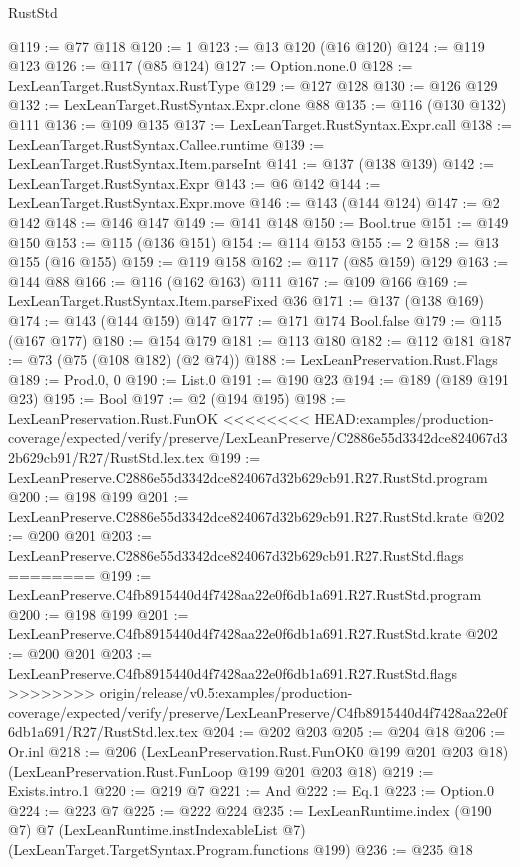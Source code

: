 \begin{lexlean}{RustStd}
\begin{coremodule}
{\begin{coremodule}
{{{{{@119 := @77 @118
@120 := 1
@123 := @13 @120 (@16 @120)
@124 := @119 @123
@126 := @117 (@85 @124)
@127 := Option.none.{0}
@128 := LexLeanTarget.RustSyntax.RustType
@129 := @127 @128
@130 := @126 @129
@132 := LexLeanTarget.RustSyntax.Expr.clone @88
@135 := @116 (@130 @132) @111
@136 := @109 @135
@137 := LexLeanTarget.RustSyntax.Expr.call
@138 := LexLeanTarget.RustSyntax.Callee.runtime
@139 := LexLeanTarget.RustSyntax.Item.parseInt
@141 := @137 (@138 @139)
@142 := LexLeanTarget.RustSyntax.Expr
@143 := @6 @142
@144 := LexLeanTarget.RustSyntax.Expr.move
@146 := @143 (@144 @124)
@147 := @2 @142
@148 := @146 @147
@149 := @141 @148
@150 := Bool.true
@151 := @149 @150
@153 := @115 (@136 @151)
@154 := @114 @153
@155 := 2
@158 := @13 @155 (@16 @155)
@159 := @119 @158
@162 := @117 (@85 @159) @129
@163 := @144 @88
@166 := @116 (@162 @163) @111
@167 := @109 @166
@169 := LexLeanTarget.RustSyntax.Item.parseFixed @36
@171 := @137 (@138 @169)
@174 := @143 (@144 @159) @147
@177 := @171 @174 Bool.false
@179 := @115 (@167 @177)
@180 := @154 @179
@181 := @113 @180
@182 := @112 @181
@187 := @73 (@75 (@108 @182) (@2 @74))
@188 := LexLeanPreservation.Rust.Flags
@189 := Prod.{0, 0}
@190 := List.{0}
@191 := @190 @23
@194 := @189 (@189 @191 @23)
@195 := Bool
@197 := @2 (@194 @195)
@198 := LexLeanPreservation.Rust.FunOK
<<<<<<<< HEAD:examples/production-coverage/expected/verify/preserve/LexLeanPreserve/C2886e55d3342dce824067d32b629cb91/R27/RustStd.lex.tex
@199 := LexLeanPreserve.C2886e55d3342dce824067d32b629cb91.R27.RustStd.program
@200 := @198 @199
@201 := LexLeanPreserve.C2886e55d3342dce824067d32b629cb91.R27.RustStd.krate
@202 := @200 @201
@203 := LexLeanPreserve.C2886e55d3342dce824067d32b629cb91.R27.RustStd.flags
========
@199 := LexLeanPreserve.C4fb8915440d4f7428aa22e0f6db1a691.R27.RustStd.program
@200 := @198 @199
@201 := LexLeanPreserve.C4fb8915440d4f7428aa22e0f6db1a691.R27.RustStd.krate
@202 := @200 @201
@203 := LexLeanPreserve.C4fb8915440d4f7428aa22e0f6db1a691.R27.RustStd.flags
>>>>>>>> origin/release/v0.5:examples/production-coverage/expected/verify/preserve/LexLeanPreserve/C4fb8915440d4f7428aa22e0f6db1a691/R27/RustStd.lex.tex
@204 := @202 @203
@205 := @204 @18
@206 := Or.inl
@218 := @206
    (LexLeanPreservation.Rust.FunOK0 @199 @201 @203 @18)
    (LexLeanPreservation.Rust.FunLoop @199 @201 @203 @18)
@219 := Exists.intro.{1}
@220 := @219 @7
@221 := And
@222 := Eq.{1}
@223 := Option.{0}
@224 := @223 @7
@225 := @222 @224
@235 := LexLeanRuntime.index
    (@190 @7)
    @7
    (LexLeanRuntime.instIndexableList @7)
    (LexLeanTarget.TargetSyntax.Program.functions @199)
@236 := @235 @18
}}}}}
\end{coremodule}}
\end{coremodule}
\end{lexlean}
